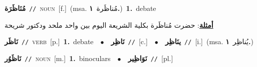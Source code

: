 \documentclass[10pt,a4paper,twoside]{article} %
\begin{document}
\begin{multicols}{2}
{\setlength\topsep{0pt}\textbf{\foreignlanguage{arabic}{مُنَاظَرَة}}\ {\color{gray}\texttt{//}\color{black}}\ \textsc{noun}\ [f.]\ \color{gray}(msa. \foreignlanguage{arabic}{مُناظَرة}~\foreignlanguage{arabic}{\textbf{١.}})\color{black}\ \textbf{1.}~debate\  \begin{flushright}\color{gray}\foreignlanguage{arabic}{\textbf{\underline{\foreignlanguage{arabic}{أمثلة}}}: حضرت مُناظَرة بكلية الشريعة اليوم بين واحد ملحد ودكتور شريحة}\end{flushright}\color{black}} \vspace{2mm}

{\setlength\topsep{0pt}\textbf{\foreignlanguage{arabic}{نَاظَر}}\ {\color{gray}\texttt{//}\color{black}}\ \textsc{verb}\ [p.]\ \textbf{1.}~debate\ \ $\bullet$\ \ \setlength\topsep{0pt}\textbf{\foreignlanguage{arabic}{نَاظِر}}\ {\color{gray}\texttt{//}\color{black}}\ [c.]\ \ $\bullet$\ \ \setlength\topsep{0pt}\textbf{\foreignlanguage{arabic}{ينَاظِر}}\ {\color{gray}\texttt{//}\color{black}}\ [i.]\ \color{gray}(msa. \foreignlanguage{arabic}{يُناظِر}~\foreignlanguage{arabic}{\textbf{١.}})\color{black}\ } \vspace{2mm}

{\setlength\topsep{0pt}\textbf{\foreignlanguage{arabic}{نَاظَوُر}}\ {\color{gray}\texttt{//}\color{black}}\ \textsc{noun}\ [m.]\ \textbf{1.}~binoculars\ \ $\bullet$\ \ \setlength\topsep{0pt}\textbf{\foreignlanguage{arabic}{نَوَاظِير}}\ {\color{gray}\texttt{//}\color{black}}\ [pl.]\ } \vspace{2mm}


\end{multicols}
\end{document}

